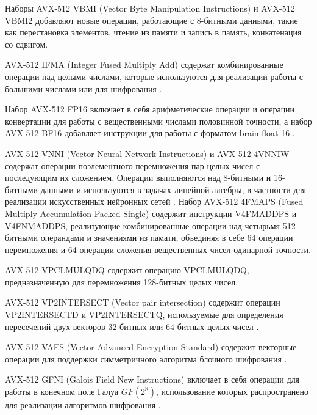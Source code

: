 Наборы AVX-512 VBMI (Vector Byte Manipulation Instructions)\label{abbr:vbmi} и AVX-512 VBMI2 добавляют новые операции, работающие с 8-битными данными, такие как перестановка элементов, чтение из памяти и запись в память, конкатенация со сдвигом.

AVX-512 IFMA (Integer Fused Multiply Add)\label{abbr:ifma2} содержат комбинированные операции над целыми числами, которые используются для реализации работы с большими числами или для шифрования \cite{Edamatsu2023VecDiv}.

Набор AVX-512 FP16\label{abbr:fp} включает в себя арифметические операции и операции конвертации для работы с вещественными числами половинной точности, а набор AVX-512 BF16\label{abbr:bf} добавляет инструкции для работы с форматом brain float 16 \cite{Kalamkar2019VecBF16}.

AVX-512 VNNI (Vector Neural Network Instructions)\label{abbr:vnni} и AVX-512 4VNNIW\label{abbr:vnniw} содержат операции поэлементного перемножения пар целых чисел с последующим их сложением.
Операции выполняются над 8-битными и 16-битными данными и используются в задачах линейной алгебры, в частности для реализации искусственных нейронных сетей \cite{Zhou2024VecVNNI}.
Набор AVX-512 4FMAPS (Fused Multiply Accumulation Packed Single)\label{abbr:fmaps} содержит инструкции V4FMADDPS и V4FNMADDPS, реализующие комбинированные операции над четырьмя 512-битными операндами и значениями из памати, объединяя в себе 64 операции перемножения и 64 операции сложения вещественных чисел одинарной точности.

AVX-512 VPCLMULQDQ содержит операцию VPCLMULQDQ, предназначенную для перемножения 128-битных целых чисел.

AVX-512 VP2INTERSECT (Vector pair intersection) содержит операции VP2INTERSECTD и VP2INTERSECTQ, используемые для определения пересечений двух векторов 32-битных или 64-битных целых чисел \cite{DiezCanas2021VecVP2Int}.

AVX-512 VAES (Vector Advanced Encryption Standard)\label{abbr:vaes} содержит векторные операции для поддержки симметричного алгоритма блочного шифрования \cite{Kovats2024VecAES}.

AVX-512 GFNI (Galois Field New Instructions)\label{abbr:gfni} включает в себя операции для работы в конечном поле Галуа $GF(2^8)$, использование которых распространено для реализации алгоритмов шифрования \cite{Yoo2023VecGFNI}.

